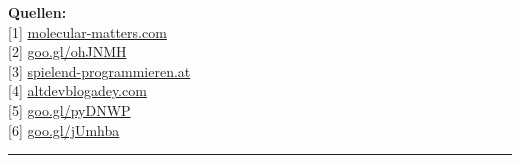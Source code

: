 \documentclass[10pt,a4paper,ngerman,twoside]{article} %
\newcommand{\SepRule}{\noindent	%
\begin{center}
\rule{250pt}{1pt} %
\end{center}
}
\begin{document}
\textbf{Quellen:} \\
{[}1{]} \href{http://www.molecular-matters.com}{molecular-matters.com} \\
{[}2{]} \href{http://www.altdevblogaday.com/2011/09/27/how-the-austrian-guy-ended-up-working-in-the-games-industry/}{goo.gl/ohJNMH} \\
{[}3{]} \href{http://spielend-programmieren.at}{spielend-programmieren.at} \\
{[}4{]} \href{http://www.altdevblogaday.com/}{altdevblogadey.com} \\
{[}5{]} \href{https://commons.wikimedia.org/wiki/File:Commodore64.jpg}{goo.gl/pyDNWP} \\
{[}6{]} \href{http://www.cg.tuwien.ac.at/courses/CG23/HallOfFame/2004/}{goo.gl/jUmhba} \\










 


\SepRule
\end{document}
